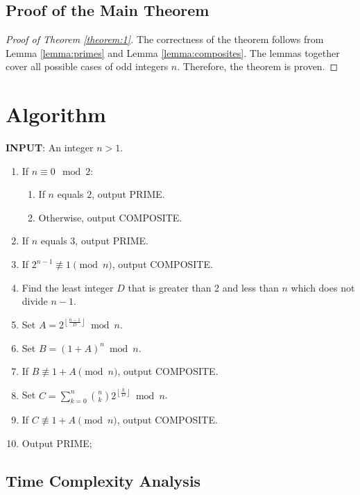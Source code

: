 \documentclass{article}
\theoremstyle{plain}
\theoremstyle{definition}
\begin{document}
\subsection{Proof of the Main Theorem}
\begin{proof}[Proof of Theorem \ref{theorem:1}]
     The correctness of the theorem follows from Lemma \ref{lemma:primes} and Lemma \ref{lemma:composites}. The lemmas together cover all possible cases of odd integers $n$. Therefore, the theorem is proven.
\end{proof}

\section{Algorithm}
\textbf{INPUT}: An integer $n > 1$.
\begin{center}
    \begin{enumerate}
        \item If $n \equiv 0 \mod{2}$:
            \begin{enumerate}
                \item If $n$ equals $2$, output PRIME.
                \item Otherwise, output COMPOSITE.
            \end{enumerate}
        \item If $n$ equals $3$, output PRIME.
        \item If $2^{n-1} \not\equiv 1 \pmod{n}$, output COMPOSITE.
        \item Find the least integer $D$ that is greater than 2 and less than $n$ which does not divide $n-1$.
        \item Set $A = 2^{\left\lfloor \frac{n-1}{D} \right\rfloor} \bmod{n}$.
        \item Set $B = (1 + A)^n \bmod{n}$.
        \item If $B \not\equiv 1 + A \pmod{n}$, output COMPOSITE.
        \item Set $C = \sum_{k=0}^{n} \binom{n}{k} 2^{\left\lfloor \frac{k}{D} \right\rfloor} \bmod{n}$.
        \item If $C \not\equiv 1 + A \pmod{n}$, output COMPOSITE.
        \item Output PRIME;
    \end{enumerate}
\end{center}

\subsection{Time Complexity Analysis}
\end{document}
